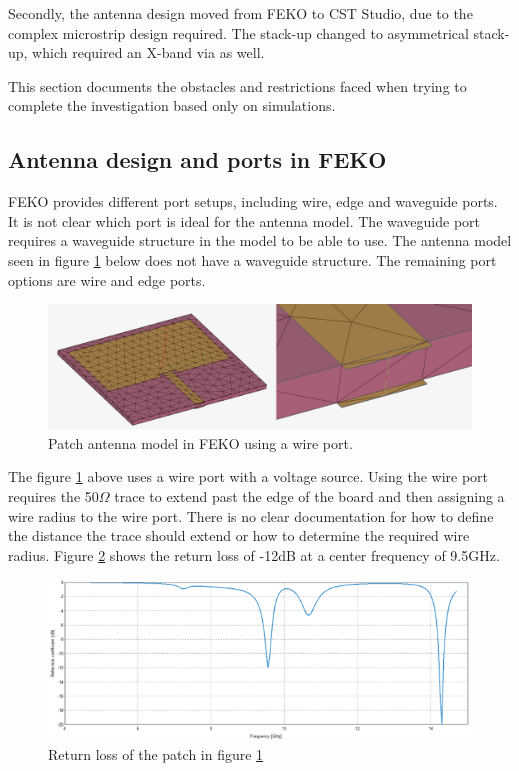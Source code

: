 Secondly, the antenna design moved from FEKO to CST Studio, due to the complex microstrip design required. The stack-up changed to asymmetrical stack-up, which required an X-band via as well.

This section documents the obstacles and restrictions faced when trying to complete the investigation based only on simulations.

\subsection{Antenna design and ports in FEKO}
FEKO provides different port setups, including wire, edge and waveguide ports. It is not clear which port is ideal for the antenna model. The waveguide port requires a waveguide structure in the model to be able to use. The antenna model seen in figure \ref{fig:chp3_patch_wire_port} below does not have a waveguide structure. The remaining port options are wire and edge ports.

    \begin{figure}[H]
    \centering
    \includegraphics[width=0.7\linewidth]{Figures/chp3_patch_wire_port.png}
    \caption{Patch antenna model in FEKO using a wire port.}
    \label{fig:chp3_patch_wire_port}
    \end{figure}

The figure \ref{fig:chp3_patch_wire_port} above uses a wire port with a voltage source. Using the wire port requires the 50$\Omega$ trace to extend past the edge of the board and then assigning a wire radius to the wire port. There is no clear documentation for how to define the distance the trace should extend or how to determine the required wire radius. Figure \ref{fig:chp3_patch_wire_port_S11} shows the return loss of -12dB at a center frequency of 9.5GHz.

    \begin{figure}[H]
    \centering
    \includegraphics[width=0.95\linewidth]{Figures/chp3_patch_wire_port_S11.png}
    \caption{Return loss of the patch in figure \ref{fig:chp3_patch_wire_port}}
    \label{fig:chp3_patch_wire_port_S11}
    \end{figure}

